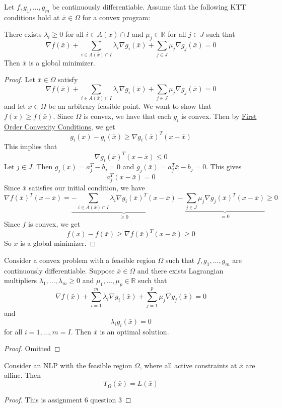 \begin{theorem}[]
    Let $f, g_1,\ldots,g_m$ be continuously differentiable. Assume that the following KTT conditions hold at $\bar x \in \Omega$ for a convex program:

    There exists $\lambda_i \geq 0$ for all $i \in A(\bar x) \cap I$ and $\mu_j \in \mathbb R$ for all $j \in J$ such that $$\nabla f(\bar x) + \sum_{i \in A(\bar x) \cap I} \lambda_i \nabla g_i(\bar x) + \sum_{j \in J} \mu_j \nabla g_j(\bar x) = 0$$
    Then $\bar x$ is a global minimizer.
\end{theorem}
\begin{proof}[Proof]
    Let $\bar x \in \Omega$ satisfy $$\nabla f(\bar x) + \sum_{i \in A(\bar x) \cap I} \lambda_i \nabla g_i(\bar x) + \sum_{j \in J} \mu_j \nabla g_j(\bar x) = 0$$ and let $x \in \Omega$ be an arbitrary feasible point. We want to show that $f(x) \geq f(\bar x)$. Since $\Omega$ is convex, we have that each $g_i$ is convex. Then by \hyperref[thm:first-order-convex]{First Order Convexity Conditions}, we get 
    $$g_i(x) - g_i(\bar x) \geq \nabla g_i(\bar x)^T (x - \bar x)$$ This implies that $$\nabla g_i(\bar x)^T (x - \bar x) \leq 0$$
    Let $j \in J$. Then $g_j(x) = a_j^T - b_j = 0$ and $g_j(\bar x) = a_j^T \bar x - b_j = 0$. This gives $$a_j^T (x - \bar x) = 0$$ Since $\bar x$ satisfies our initial condition, we have 
    $$\nabla f(\bar x)^T (x - \bar x) = \underbrace{-\sum_{i \in A(\bar x) \cap I} \lambda_i \nabla g_i(\bar x)^T (x - \bar x)}_{\geq 0} - \underbrace{\sum_{j \in J} \mu_j \nabla g_j(\bar x)^T (x - \bar x)}_{= 0} \geq 0$$
    Since $f$ is convex, we get $$f(x) - f(\bar x) \geq \nabla f(\bar x)^T (x - \bar x) \geq 0$$ So $\bar x$ is a global minimizer.
\end{proof}
\begin{theorem}[]
    Consider a convex problem with a feasible region $\Omega$ such that $f, g_1,\ldots,g_m$ are continuously differentiable. Suppose $\bar x \in \Omega$ and there exists Lagrangian multipliers $\lambda_1,\ldots, \lambda_m \geq 0$ and $\mu_1,\ldots,\mu_p \in \mathbb R$ such that $$\nabla f(\bar x) + \sum^m_{i=1} \lambda_i \nabla g_i(\bar x) + \sum^p_{j=1} \mu_j \nabla g_j(\bar x) = 0$$ and $$\lambda_i g_i(\bar x) = 0$$ for all $i = 1,\ldots,m = I$. Then $\bar x$ is an optimal solution.
\end{theorem}
\begin{proof}[Proof]
    Omitted
\end{proof}
\begin{theorem}[]
    Consider an NLP with the feasible region $\Omega$, where all active constraints at $\bar x$ are affine. Then $$T_\Omega(\bar x) = L(\bar x)$$
\end{theorem}
\begin{proof}[Proof]
    This is assignment 6 question 3
\end{proof}
